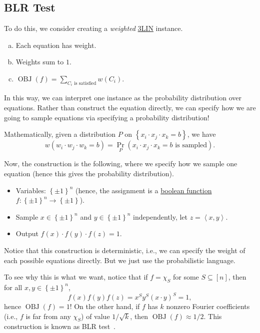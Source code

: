 \subsection{BLR Test}
To do this, we consider creating a \emph{weighted} \hyperref[prb:max-3LIN]{3LIN} instance.
\begin{enumerate}[(a)]
	\item Each equation has weight.
	\item Weights sum to \(1\).
	\item \(\mathop{\mathrm{OBJ}}(f) = \sum_{C_i \text{ is satisfied}} w(C_i)\).
\end{enumerate}
In this way, we can interpret one instance as the probability distribution over equations. Rather than construct the equation directly, we can specify how we are going to sample equations via specifying a probability distribution!

\begin{remark}
	Mathematically, given a distribution \(P\) on \(\left\{ x_i\cdot x_j \cdot x_k = b \right\} \), we have
	\[
		w(w_{i} \cdot w_{j} \cdot w_{k} = b) = \Pr_{P}(\text{\(x_i \cdot x_j \cdot x_k = b\) is sampled} ).
	\]
\end{remark}

Now, the construction is the following, where we specify how we sample one equation (hence this gives the probability distribution).
\begin{itemize}
	\item Variables: \(\left\{ \pm 1 \right\} ^n\) (hence, the assignment is a \hyperref[def:boolean-function]{boolean function} \(f\colon \left\{ \pm 1 \right\} ^n \to  \left\{ \pm 1 \right\} \)).
	\item Sample \(x\in \left\{ \pm 1 \right\} ^n\) and \(y\in \left\{ \pm 1 \right\} ^n\) independently, let \(z = \left\langle x, y \right\rangle \).
	\item Output \(f(x) \cdot f(y)\cdot f(z) = 1\).
\end{itemize}

\begin{note}
	Notice that this construction is deterministic, i.e., we can specify the weight of each possible equations directly. But we just use the probabilistic language.
\end{note}

To see why this is what we want, notice that if \(f = \chi _S\) for some \(S \subseteq [n]\), then for all \(x, y\in \left\{ \pm 1 \right\} ^n\),
\[
	f(x) f(y) f(z) = x^S y^S (x\cdot y)^S = 1,
\]
hence \(\mathop{\mathrm{OBJ}}(f) = 1\)! On the other hand, if \(f\) has \(k\) nonzero Fourier coefficients (i.e., \(f\) is far from any \(\chi _S\)) of value \(1 / \sqrt{k} \), then \(\mathop{\mathrm{OBJ}}(f) \approx 1 / 2\). This construction is known as BLR test~\cite{10.1145/100216.100225}.

